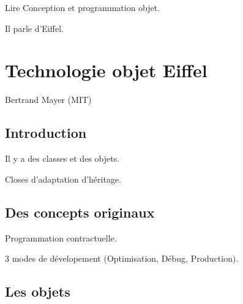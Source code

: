\documentclass[a4paper,11pt]{article}
\begin{document}
Lire Conception et programmation objet.

Il parle d'Eiffel.

\section{Technologie objet Eiffel}

Bertrand Mayer (MIT)

\subsection{Introduction}

Il y a des classes et des objets.

Closes d'adaptation d'héritage.

\subsection{Des concepts originaux}

Programmation contractuelle.

3 modes de dévelopement (Optimisation, Débug, Production).

\subsection{Les objets}
\end{document}
